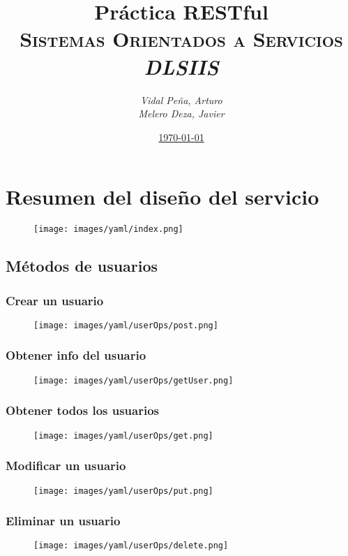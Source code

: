 \documentclass[12pt,a4paper, spanish]{article}
\title{\textbf{Práctica RESTful} \\
       \textsc{Sistemas Orientados a Servicios} \\
       \emph{DLSIIS}}
\author{\emph{Vidal Peña, Arturo}\\
        \emph{Melero Deza, Javier}}
\date{\underline{\today}}
\begin{document}
\maketitle
\thispagestyle{empty}
\renewcommand*\contentsname{Índice de contenidos}
\tableofcontents
\pagebreak


\section{Resumen del diseño del servicio}
	\begin{figure}[H]
		\centering
		\texttt{[image: images/yaml/index.png]}
	\end{figure}
\subsection{Métodos de usuarios}
\subsubsection{Crear un usuario}
\begin{figure}[H]
	\centering
	\texttt{[image: images/yaml/userOps/post.png]}
\end{figure}
\subsubsection{Obtener info del usuario}
\begin{figure}[H]
	\centering
	\texttt{[image: images/yaml/userOps/getUser.png]}
\end{figure}
\subsubsection{Obtener todos los usuarios}
\begin{figure}[H]
	\centering
	\texttt{[image: images/yaml/userOps/get.png]}
\end{figure}
\subsubsection{Modificar un usuario}
\begin{figure}[H]
	\centering
	\texttt{[image: images/yaml/userOps/put.png]}
\end{figure}
\subsubsection{Eliminar un usuario}
\begin{figure}[H]
	\centering
	\texttt{[image: images/yaml/userOps/delete.png]}
\end{figure}
\end{document}
